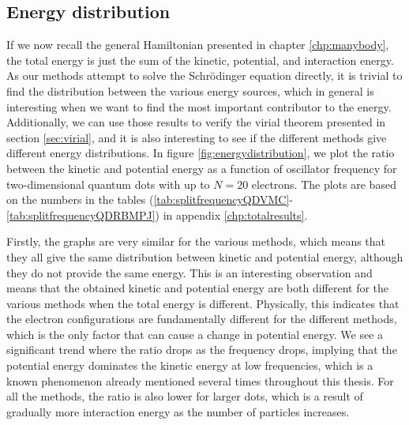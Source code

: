 \subsection{Energy distribution} \label{sec:energydistributions}
If we now recall the general Hamiltonian presented in chapter \ref{chp:manybody}, the total energy is just the sum of the kinetic, potential, and interaction energy. As our methods attempt to solve the Schrödinger equation directly, it is trivial to find the distribution between the various energy sources, which in general is interesting when we want to find the most important contributor to the energy. Additionally, we can use those results to verify the virial theorem presented in section \ref{sec:virial}, and it is also interesting to see if the different methods give different energy distributions. In figure \eqref{fig:energydistribution}, we plot the ratio between the kinetic and potential energy as a function of oscillator frequency for two-dimensional quantum dots with up to $N=20$ electrons. The plots are based on the numbers in the tables (\ref{tab:splitfrequencyQDVMC}-\ref{tab:splitfrequencyQDRBMPJ}) in appendix \ref{chp:totalresults}. 



Firstly, the graphs are very similar for the various methods, which means that they all give the same distribution between kinetic and potential energy, although they do not provide the same energy. This is an interesting observation and means that the obtained kinetic and potential energy are both different for the various methods when the total energy is different. Physically, this indicates that the electron configurations are fundamentally different for the different methods, which is the only factor that can cause a change in potential energy. We see a significant trend where the ratio drops as the frequency drops, implying that the potential energy dominates the kinetic energy at low frequencies, which is a known phenomenon already mentioned several times throughout this thesis. For all the methods, the ratio is also lower for larger dots, which is a result of gradually more interaction energy as the number of particles increases.

